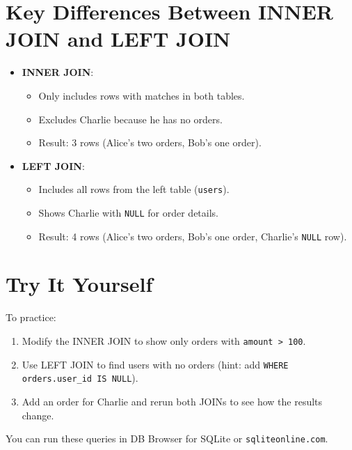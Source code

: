\documentclass{article}
\begin{document}
\section*{Key Differences Between INNER JOIN and LEFT JOIN}
\begin{itemize}
    \item \textbf{INNER JOIN}:
    \begin{itemize}
        \item Only includes rows with matches in both tables.
        \item Excludes Charlie because he has no orders.
        \item Result: 3 rows (Alice’s two orders, Bob’s one order).
    \end{itemize}
    \item \textbf{LEFT JOIN}:
    \begin{itemize}
        \item Includes all rows from the left table (\texttt{users}).
        \item Shows Charlie with \texttt{NULL} for order details.
        \item Result: 4 rows (Alice’s two orders, Bob’s one order, Charlie’s \texttt{NULL} row).
    \end{itemize}
\end{itemize}

\section*{Try It Yourself}
To practice:
\begin{enumerate}
    \item Modify the INNER JOIN to show only orders with \texttt{amount > 100}.
    \item Use LEFT JOIN to find users with no orders (hint: add \texttt{WHERE orders.user\_id IS NULL}).
    \item Add an order for Charlie and rerun both JOINs to see how the results change.
\end{enumerate}

You can run these queries in DB Browser for SQLite or \texttt{sqliteonline.com}.
\end{document}
